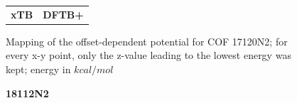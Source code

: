 \begin{figure}[H]
{\begin{tabular}{cc}
\textbf{\Large{xTB}}\par\medskip & \textbf{\Large{DFTB+}}\par\medskip\\
\end{tabular}}
\caption{Mapping of the offset-dependent potential for COF 17120N2; for every x-y point, only the z-value leading to the lowest energy was kept; energy in $kcal/mol$}
\label{fig:17maps}
\end{figure}



\begin{figure}[H]
\vspace{2cm}
\begin{centering}
\textbf{\LARGE{18112N2}}\par\medskip
\end{centering}
\end{figure}
